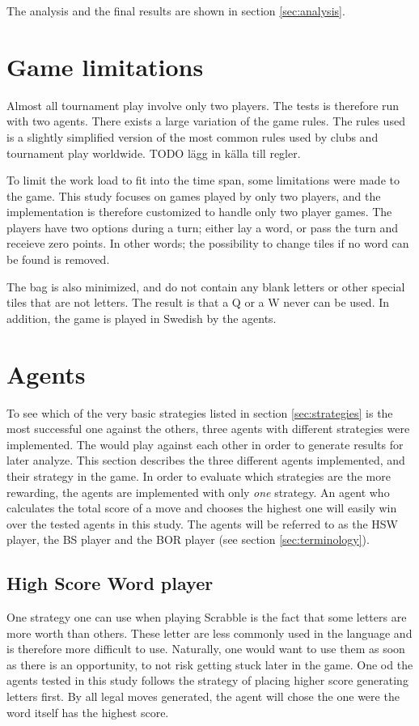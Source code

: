 \documentclass[a4paper, 12pt]{report}
\begin{document}
The analysis and the final results are shown in section \ref{sec:analysis}.

\section{Game limitations}
\label{sec:limitations}
Almost all tournament play involve only two players. The tests is therefore run with two agents. There exists a large variation of the game rules. The rules used is a slightly simplified version of the most common rules used by clubs and tournament play worldwide. TODO lägg in källa till regler.

To limit the work load to fit into the time span, some limitations were made to the game. This study focuses on games played by only two players, and the implementation is therefore customized to handle only two player games. The players have two options during a turn; either lay a word, or pass the turn and receieve zero points. In other words; the possibility to change tiles if no word can be found is removed. 

The bag is also minimized, and do not contain any blank letters or other special tiles that are not letters. The result is that a Q or a W never can be used. In addition, the game is played in Swedish by the agents.

\section{Agents}
\label{sec:agents}
To see which of the very basic strategies listed in section \ref{sec:strategies} is the most successful one against the others, three agents with different strategies were implemented. The would play against each other in order to generate results for later analyze. This section describes the three different agents implemented, and their strategy in the game. In order to evaluate which strategies are the more rewarding, the agents are implemented with only \emph{one} strategy. An agent who calculates the total score of a move and chooses the highest one will easily win over the tested agents in this study. The agents will be referred to as the HSW player, the BS player and the BOR player (see section \ref{sec:terminology}).

\subsection{High Score Word player}
One strategy one can use when playing Scrabble is the fact that some letters are more worth than others. These letter are less commonly used in the language and is therefore more difficult to use. Naturally, one would want to use them as soon as there is an opportunity, to not risk getting stuck later in the game. One od the agents tested in this study follows the strategy of placing higher score generating letters first. By all legal moves generated, the agent will chose the one were the word itself has the highest score. 
\end{document}
